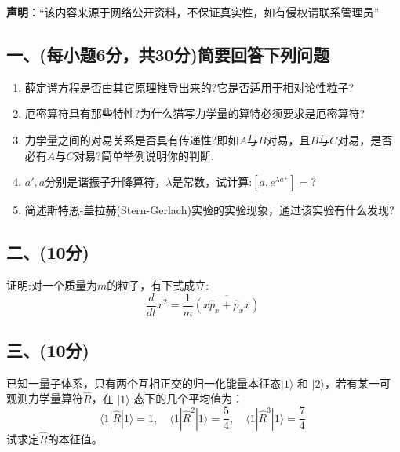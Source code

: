 
\textbf{声明}：“该内容来源于网络公开资料，不保证真实性，如有侵权请联系管理员”

\subsection{一、(每小题6分，共30分)简要回答下列问题}
\begin{enumerate}
\item 薛定谔方程是否由其它原理推导出来的?它是否适用于相对论性粒子?
\item 厄密算符具有那些特性?为什么猫写力学量的算特必须要求是厄密算符?
\item 力学量之间的对易关系是否具有传递性?即如$A$与$B$对易，且$B$与$C$对易，是否必有$A$与$C$对易?简单举例说明你的判断.
\item $a',a$分别是谐振子升降算符，$\lambda$是常数，试计算:$\left[ a,e^{\lambda a^+} \right]=?$
\item 简述斯特恩-盖拉赫(Stern-Gerlach)实验的实验现象，通过该实验有什么发现?
\end{enumerate}
\subsection{二、(10分)}
证明:对一个质量为$m$的粒子，有下式成立:
$$\frac{d}{dt} \overline{x^2} = \frac{1}{m} \overline{\left( {x} \hat{p}_x + \hat{p}_x {x}\right)}~$$
\subsection{三、(10分)}
已知一量子体系，只有两个互相正交的归一化能量本征态$|1\rangle$ 和 $|2\rangle$，若有某一可观测力学量算符$\hat{R}$，在 $|1\rangle$ 态下的几个平均值为：
$$\langle 1|\hat{R}|1\rangle = 1,\quad \langle 1|\hat{R}^2|1\rangle = \frac{5}{4},\quad \langle 1|\hat{R}^3|1\rangle = \frac{7}{4}~$$
试求定$\hat{R}$的本征值。